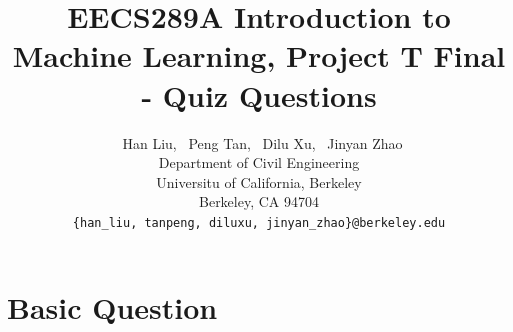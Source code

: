 \documentclass{article}
\begin{document}
\title{EECS289A Introduction to Machine Learning,  Project T Final - Quiz Questions}
\author{%
  \ Han Liu, \ Peng Tan, \ Dilu Xu, \ Jinyan Zhao \\
  Department of Civil Engineering\\
  Universitu of California, Berkeley\\
  Berkeley, CA 94704 \\
  \texttt{\{han\_liu, tanpeng, diluxu, jinyan\_zhao\}@berkeley.edu} \\
}
\maketitle

\section{Basic Question}
\end{document}
